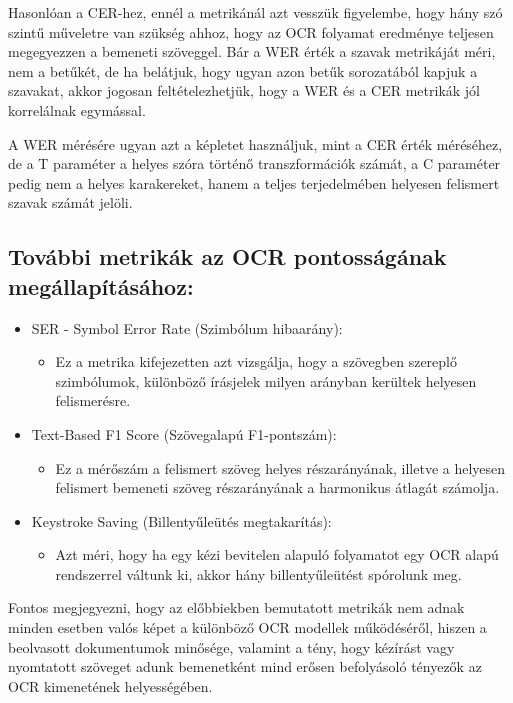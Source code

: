 \documentclass[12pt]{report}
\begin{document}
Hasonlóan a CER-hez, ennél a metrikánál azt vesszük figyelembe, hogy hány szó szintű műveletre van szükség ahhoz, hogy az OCR folyamat eredménye teljesen megegyezzen a bemeneti szöveggel. Bár a WER érték a szavak metrikáját méri, nem a betűkét, de ha belátjuk, hogy ugyan azon betűk sorozatából kapjuk a szavakat, akkor jogosan feltételezhetjük, hogy a WER és a CER metrikák jól korrelálnak egymással.

\newline
A WER mérésére ugyan azt a képletet használjuk, mint a CER érték méréséhez, de a T paraméter a helyes szóra történő transzformációk számát, a C paraméter pedig nem a helyes karakereket, hanem a teljes terjedelmében helyesen felismert szavak számát jelöli.

\pagebreak
\subsection{További metrikák az OCR pontosságának megállapításához:}

\begin{itemize}
    \item SER - Symbol Error Rate (Szimbólum hibaarány):
    \begin{itemize}
	   \item Ez a metrika kifejezetten azt vizsgálja, hogy a szövegben szereplő szimbólumok, különböző írásjelek milyen arányban kerültek helyesen felismerésre.
    \end{itemize}
    \item Text-Based F1 Score (Szövegalapú F1-pontszám):
    \begin{itemize}
	   \item Ez a mérőszám a felismert szöveg helyes részarányának, illetve a helyesen felismert bemeneti szöveg részarányának a harmonikus átlagát számolja.
    \end{itemize}
    \item Keystroke Saving (Billentyűleütés megtakarítás):
    \begin{itemize}
	   \item Azt méri, hogy ha egy kézi bevitelen alapuló folyamatot egy OCR alapú rendszerrel váltunk ki, akkor hány billentyűleütést spórolunk meg.
    \end{itemize}
\end{itemize}

Fontos megjegyezni, hogy az előbbiekben bemutatott metrikák nem adnak minden esetben valós képet a különböző OCR modellek működéséről, hiszen a beolvasott dokumentumok minősége, valamint a tény, hogy kézírást vagy nyomtatott szöveget adunk bemenetként mind erősen befolyásoló tényezők az OCR kimenetének helyességében.
\end{document}
